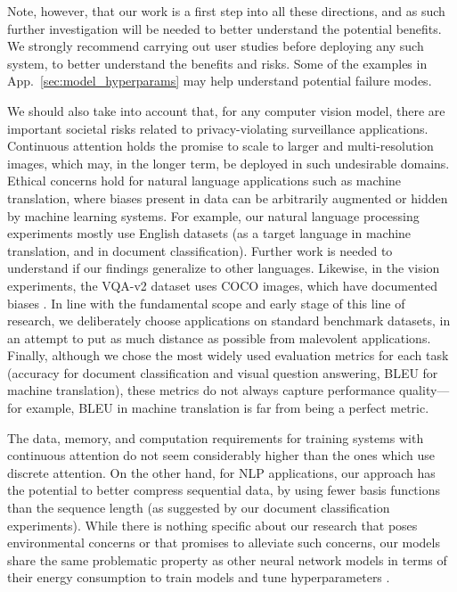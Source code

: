 \documentclass{article}
\begin{document}
Note, however, that our work is a first step into all these directions, and as such further investigation will be needed to better understand the potential benefits. We strongly recommend carrying out user studies before deploying any such system, to better understand the benefits and risks. Some of the examples in App.~\ref{sec:model_hyperparams} may help understand potential failure modes. 



We should also take into account that, for any computer vision model, there are important societal risks related to privacy-violating surveillance applications. Continuous attention holds the promise to scale to larger and multi-resolution images, which may, in the longer term, be deployed in such undesirable domains. 
Ethical concerns hold for natural language applications such as machine translation, where 
biases present in data can be arbitrarily augmented or hidden by machine learning systems.
For example, our natural language processing experiments mostly use English datasets (as a
target language in machine translation, and in document classification). 
Further work is needed to understand if our findings generalize to other languages. Likewise, in the vision experiments, the VQA-v2 dataset uses COCO images, which have documented biases \citep{wang2019balanced}. 
In line with the fundamental scope and early stage of this line of research, we deliberately choose applications on standard benchmark datasets, in an attempt to put as much distance as possible from malevolent applications. 
Finally, although we chose the most widely used evaluation metrics for each task (accuracy for document classification and visual question answering, BLEU for machine translation), these metrics do not always capture performance quality---for example, BLEU in machine translation is far from being a perfect metric.

The data, memory, and computation requirements for training systems with continuous attention do not seem considerably higher than the ones which use discrete attention. On the other hand, for NLP applications, our approach has the potential to better compress sequential data, by using fewer basis functions than the sequence length (as suggested by our document classification experiments). While there is nothing specific about our research that poses environmental concerns  or that promises to alleviate such concerns, our models share the same problematic property as other neural network models in terms of their energy consumption to train models and tune hyperparameters \citep{strubell2019energy}.
\end{document}
